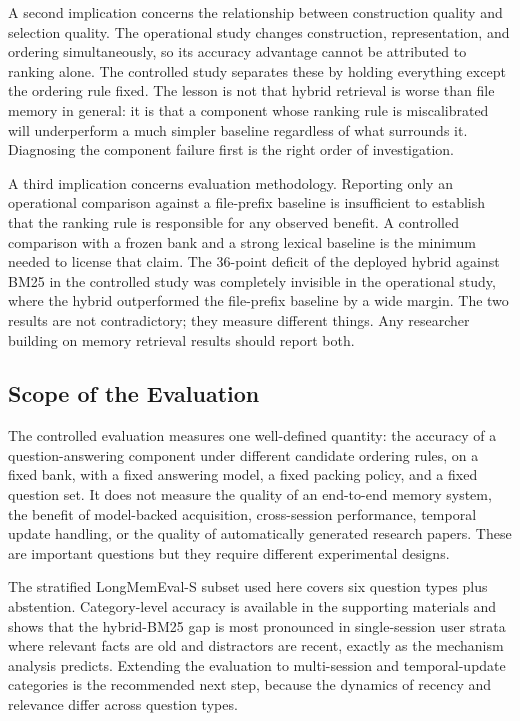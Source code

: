 A second implication concerns the relationship between construction quality and selection quality. The operational study changes construction, representation, and ordering simultaneously, so its accuracy advantage cannot be attributed to ranking alone. The controlled study separates these by holding everything except the ordering rule fixed. The lesson is not that hybrid retrieval is worse than file memory in general: it is that a component whose ranking rule is miscalibrated will underperform a much simpler baseline regardless of what surrounds it. Diagnosing the component failure first is the right order of investigation.

A third implication concerns evaluation methodology. Reporting only an operational comparison against a file-prefix baseline is insufficient to establish that the ranking rule is responsible for any observed benefit. A controlled comparison with a frozen bank and a strong lexical baseline is the minimum needed to license that claim. The 36-point deficit of the deployed hybrid against BM25 in the controlled study was completely invisible in the operational study, where the hybrid outperformed the file-prefix baseline by a wide margin. The two results are not contradictory; they measure different things. Any researcher building on memory retrieval results should report both.

\subsection{Scope of the Evaluation}

\label{sec:disc_scope}

The controlled evaluation measures one well-defined quantity: the accuracy of a question-answering component under different candidate ordering rules, on a fixed bank, with a fixed answering model, a fixed packing policy, and a fixed question set. It does not measure the quality of an end-to-end memory system, the benefit of model-backed acquisition, cross-session performance, temporal update handling, or the quality of automatically generated research papers. These are important questions but they require different experimental designs.

The stratified LongMemEval-S subset used here covers six question types plus abstention. Category-level accuracy is available in the supporting materials and shows that the hybrid-BM25 gap is most pronounced in single-session user strata where relevant facts are old and distractors are recent, exactly as the mechanism analysis predicts. Extending the evaluation to multi-session and temporal-update categories is the recommended next step, because the dynamics of recency and relevance differ across question types.

